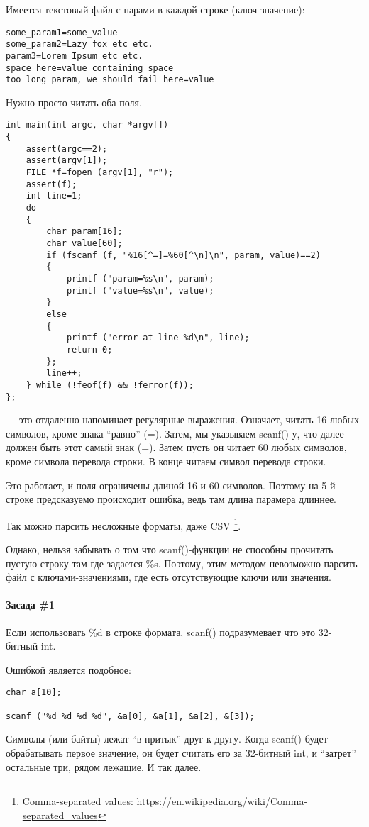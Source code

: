 Имеется текстовый файл с парами в каждой строке (ключ-значение):

\begin{lstlisting}
some_param1=some_value
some_param2=Lazy fox etc etc.
param3=Lorem Ipsum etc etc.
space here=value containing space
too long param, we should fail here=value
\end{lstlisting}

Нужно просто читать оба поля.

\begin{lstlisting}
int main(int argc, char *argv[])
{
	assert(argc==2);
	assert(argv[1]);
	FILE *f=fopen (argv[1], "r");
	assert(f);
	int line=1;
	do
	{
		char param[16];
		char value[60];
		if (fscanf (f, "%16[^=]=%60[^\n]\n", param, value)==2)
		{
			printf ("param=%s\n", param);
			printf ("value=%s\n", value);
		}
		else
		{
			printf ("error at line %d\n", line);
			return 0;
		};
		line++;
	} while (!feof(f) && !ferror(f));
};
\end{lstlisting}

 --- это отдаленно напоминает регулярные выражения. Означает, читать 16 любых символов, кроме
знака ``равно'' (=). Затем, мы указываем scanf()-у, что далее должен быть этот самый знак (=). Затем
пусть он читает 60 любых символов, кроме символа перевода строки. В конце читаем символ перевода строки.

Это работает, и поля ограничены длиной 16 и 60 символов. Поэтому на 5-й строке предсказуемо происходит ошибка,
ведь там длина парамера длиннее.

Так можно парсить несложные форматы, даже CSV
\footnote{Comma-separated values: \url{https://en.wikipedia.org/wiki/Comma-separated_values}}.

Однако, нельзя забывать о том что scanf()-функции не способны прочитать пустую строку там где задается \%s.
Поэтому, этим методом невозможно парсить файл с ключами-значениями, где есть отсутствующие ключи или значения.

\paragraph{Засада \#1}

Если использовать \%d в строке формата, scanf() подразумевает что это 32-битный int. 

Ошибкой является подобное:

\begin{lstlisting}
char a[10];

scanf ("%d %d %d %d", &a[0], &a[1], &a[2], &[3]);
\end{lstlisting}

Символы (или байты) лежат ``в притык'' друг к другу. Когда scanf() будет обрабатывать первое значение, он будет считать
его за 32-битный int, и ``затрет'' остальные три, рядом лежащие. И так далее.
